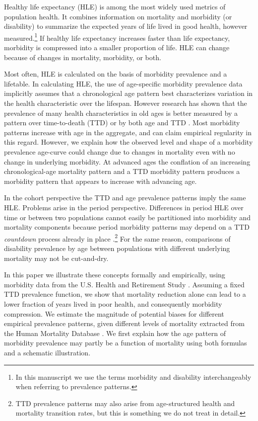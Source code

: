 \documentclass[12pt,oneside,letterpaper,doublespacing]{article}  %
\begin{document}
Healthy life expectancy (HLE) is among the most widely used metrics of
population health. It combines information on mortality and morbidity (or disability) to
summarize the expected years of life lived in good health, however measured.\footnote{In this manuscript we use the terms morbidity and disability interchangeably when referring to prevalence patterns.} If
healthy life expectancy increases faster than life expectancy, morbidity is
compressed into a smaller proportion of life. HLE can change because of changes in mortality, morbidity, or both.

Most often, HLE is calculated on the basis of morbidity prevalence and a lifetable. In calculating HLE, the use of age-specific morbidity prevalence data implicitly
assumes that a chronological age pattern best characterizes variation in the
health characteristic over the lifespan. However research has shown that the prevalence of many health characteristics in old ages is better measured by a pattern over time-to-death (TTD) or by both age and TTD \citep{klijs2010disability,riffe2017ttd,rehkopf2016cross}. Most morbidity
patterns increase with age in the aggregate, and can claim empirical regularity
in this regard. However, we explain how the observed level and shape of a morbidity prevalence age-curve
could change due to changes in mortality even with no change in underlying morbidity. At advanced ages the conflation of an increasing chronological-age mortality pattern and a TTD morbidity pattern produces a morbidity pattern that appears to increase with advancing age. 

In the cohort perspective the TTD and age prevalence patterns imply the same HLE.
Problems arise in the period perspective. Differences in period HLE over
time or between two populations cannot easily be partitioned into morbidity and
mortality components because period morbidity patterns may depend on a TTD \emph{countdown} process already in place \citep{wolf2015disability}.\footnote{TTD prevalence patterns may also arise from age-structured health and mortality transition rates, but this is something we do not treat in detail.}
For the same reason, comparisons of disability prevalence by age between populations with different underlying mortality may not be cut-and-dry.

In this paper we illustrate these concepts formally and empirically, using morbidity data from the U.S. Health and Retirement Study \citep{RAND, HRS}. Assuming a fixed TTD prevalence function, we show that mortality reduction alone can lead to a lower fraction of years lived in poor health, and consequently morbidity compression. We estimate the magnitude of potential biases for different empirical prevalence patterns, given different levels of mortality extracted from the Human Mortality Database \citep{HMD2018}. We first explain how the age pattern of morbidity prevalence may partly be a function of mortality using both formulas and a schematic illustration.
\end{document}
